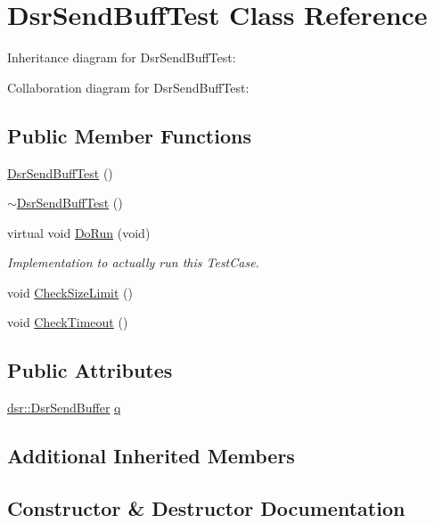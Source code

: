 \hypertarget{classDsrSendBuffTest}{}\section{Dsr\+Send\+Buff\+Test Class Reference}
\label{classDsrSendBuffTest}


Inheritance diagram for Dsr\+Send\+Buff\+Test\+:


Collaboration diagram for Dsr\+Send\+Buff\+Test\+:
\subsection*{Public Member Functions}
\begin{DoxyCompactItemize}
\item 
\hyperlink{classDsrSendBuffTest_a10b77b2ce61a5a9193b32410a5e09ee6}{Dsr\+Send\+Buff\+Test} ()
\item 
\hyperlink{classDsrSendBuffTest_aece96b51cb7d2ffa1c0035994e6eeb8d}{$\sim$\+Dsr\+Send\+Buff\+Test} ()
\item 
virtual void \hyperlink{classDsrSendBuffTest_a98ebe176520fd302d00226003ffd6636}{Do\+Run} (void)
\begin{DoxyCompactList}\small\item\em Implementation to actually run this Test\+Case. \end{DoxyCompactList}\item 
void \hyperlink{classDsrSendBuffTest_a1098fcaace1182d29902ec5b921a1022}{Check\+Size\+Limit} ()
\item 
void \hyperlink{classDsrSendBuffTest_a7ee9e5c91ebe653dc7f4783ae92ccd99}{Check\+Timeout} ()
\end{DoxyCompactItemize}
\subsection*{Public Attributes}
\begin{DoxyCompactItemize}
\item 
\hyperlink{classns3_1_1dsr_1_1DsrSendBuffer}{dsr\+::\+Dsr\+Send\+Buffer} \hyperlink{classDsrSendBuffTest_a83f4a850e85cfbe57261e4785340411a}{q}
\end{DoxyCompactItemize}
\subsection*{Additional Inherited Members}


\subsection{Constructor \& Destructor Documentation}
